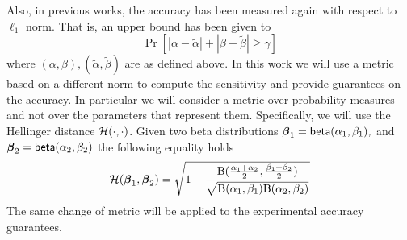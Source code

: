 \documentclass[sigconf, anonymous]{acmart}
\begin{document}
\noindent Also, in previous works, the accuracy has been measured again with respect to
$\ell_1$ norm. That is, an upper bound has been given to
\[
  \Pr[|\alpha - \tilde\alpha| + |\beta - \tilde\beta |\geq \gamma ]
\]
where $(\alpha, \beta), (\tilde\alpha,\tilde\beta)$ are as  defined above.
In this work we will use a metric based on a different norm to compute the sensitivity
and provide guarantees on the accuracy. In particular we will consider a metric
over probability measures and not over the parameters that represent them.
Specifically, we will use the Hellinger distance $\mathcal{H}(\cdot,\cdot)$. Given two beta distributions
$\boldsymbol{\beta}_1=\mathsf{beta}(\alpha_1, \beta_1),$ and $\boldsymbol{\beta}_2=\mathsf{beta}(\alpha_2, \beta_2)$ the following equality holds 
\[
  \mathcal{H}(\boldsymbol{\beta}_1, \boldsymbol{\beta}_2)=
  \sqrt{1 - \frac{\textup{B}(\frac{\alpha_1 + \alpha_2}{2}, \frac{\beta_1 + \beta_2}{2})}{\sqrt{\textup{B}(\alpha_1,\beta_1)\textup{B}(\alpha_2,\beta_2)}}}
\]
The same change of metric will be applied to the experimental accuracy guarantees.
\end{document}
